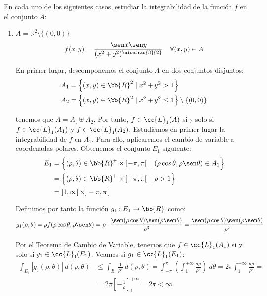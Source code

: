 \begin{ejercicio}
    En cada uno de los siguientes casos, estudiar la integrabilidad de la función \( f \) en el conjunto \( A \):

    \begin{enumerate}
        \item \( A = \mathbb{R}^2 \setminus \{(0, 0)\} \)
        \[ f(x, y) = \frac{\sen x \sen y}{(x^2 + y^2)^{\nicefrac{3}{2}}} \quad \forall (x, y) \in A \]

        En primer lugar, descomponemos el conjunto $A$ en dos conjuntos disjuntos:
        \begin{align*}
            A_1 &= \left\{ (x, y) \in \bb{R}^2 \mid x^2 + y^2 > 1 \right\} \\
            A_2 &= \left\{ (x, y) \in \bb{R}^2 \mid x^2 + y^2 \leq 1 \right\}\setminus \{(0, 0)\}
        \end{align*}

        tenemos que $A=A_1 \uplus A_2$. Por tanto, $f\in \cc{L}_1(A)$ si y solo si $f\in \cc{L}_1(A_1)$ y $f\in \cc{L}_1(A_2)$. Estudiemos en primer lugar la integrabilidad de $f$ en $A_1$.
        Para ello, aplicaremos el cambio de variable a coordenadas polares. Obtenemos el conjunto $E_1$ siguiente:
        \begin{align*}
            E_1 &= \left\{ (\rho, \theta) \in \bb{R}^+\times \left]-\pi, \pi\right[ ~\mid (\rho\cos\theta, \rho\sen\theta) \in A_1 \right\} \\
            &= \left\{ (\rho, \theta) \in \bb{R}^+\times \left]-\pi, \pi\right[ ~\mid \rho > 1 \right\} \\
            &= \left]1,\infty\right[\times ]-\pi, \pi[
        \end{align*}

        Definimos por tanto la función $g_1: E_1 \to \bb{R}$ como:
        \begin{equation*}
            g_1(\rho, \theta) = \rho f(\rho\cos\theta, \rho\sen\theta) = \rho\cdot \frac{\sen(\rho\cos\theta) \sen(\rho\sen\theta)}{\rho^3}
            = \frac{\sen(\rho\cos\theta) \sen(\rho\sen\theta)}{\rho^2}
        \end{equation*}

        Por el Teorema de Cambio de Variable, tenemos que $f\in \cc{L}_1(A_1)$ si y solo si $g_1\in \cc{L}_1(E_1)$. Veamos si $g_1\in \cc{L}_1(E_1)$:
        \begin{align*}
            \int_{E_1} |g_1(\rho, \theta)|~d(\rho, \theta)
            &\leq \int_{E_1} \frac{1}{\rho^2}~d(\rho, \theta)
            = \int_{-\pi}^\pi \left( \int_1^{+\infty} \frac{d\rho}{\rho^2} \right)~d\theta
            = 2\pi \int_1^{+\infty} \frac{d\rho}{\rho^2} =\\
            &= 2\pi \left[ -\frac{1}{\rho} \right]_1^{+\infty} = 2\pi < \infty
        \end{align*}
        

\end{enumerate}
\end{ejercicio}
